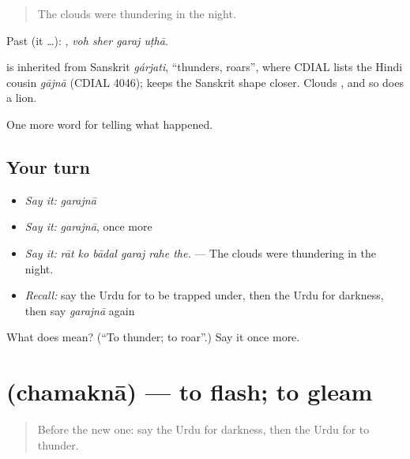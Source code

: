 \begin{quote}
The clouds were thundering in the night.
\end{quote}

Past (it …):    , \emph{voh sher garaj uṭhā}.

\begin{cousinweb}
is inherited from Sanskrit \emph{gárjati}, \textquotedblleft{}thunders, roars\textquotedblright{}, where CDIAL lists the Hindi cousin \emph{gājnā} (CDIAL 4046); \textbf{} keeps the Sanskrit shape closer. Clouds \textbf{ }, and so does a lion.
\end{cousinweb}

\begin{grammarlens}[title={What you've built}]
One more word for telling what happened.
\end{grammarlens}

\subsection*{Your turn}
\begin{itemize}
\raggedright
  \item \emph{Say it:} \emph{garajnā}
  \item \emph{Say it:} \emph{garajnā}, once more
  \item \emph{Say it:} \emph{rāt ko bādal garaj rahe the.} — The clouds were thundering in the night.
  \item \emph{Recall:} say the Urdu for to be trapped under, then the Urdu for darkness, then say \emph{garajnā} again
\end{itemize}

\begin{tcolorbox}[breakable,colback=teal!4,colframe=teal!35!black,title={Before you move on}]
What does  mean? (\textquotedblleft{}To thunder; to roar\textquotedblright{}.) Say it once more.
\end{tcolorbox}
\section[\texorpdfstring{\ur{چمکنا} (chamaknā)}{چمکنا (chamaknā)}]{ (chamaknā) — to flash; to gleam}

\label{lesson:UR-C292-chamakna}



\begin{quote}
Before the new one: say the Urdu for darkness, then the Urdu for to thunder.
\end{quote}

